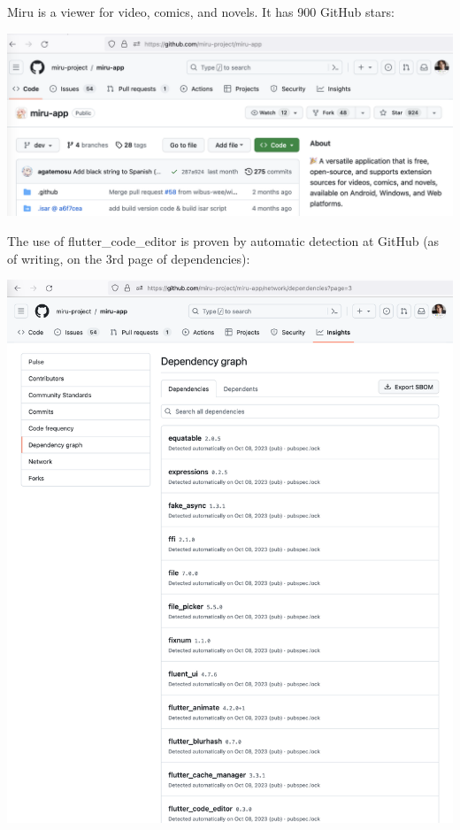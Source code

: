 
Miru is a viewer for video, comics, and novels.
It has 900 GitHub stars:

\begin{center}
    \includegraphics[width=\textwidth]{stars}
\end{center}

The use of flutter\_code\_editor is proven by automatic detection at GitHub
(as of writing, on the 3rd page of dependencies):

\begin{center}
    \includegraphics[width=\textwidth]{dependencies}
\end{center}

\pagebreak
